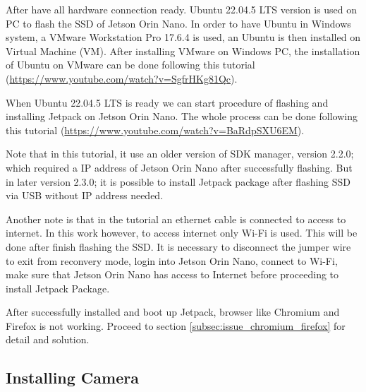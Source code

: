 \documentclass[12pt,hidelinks]{article}
\begin{document}
        \vspace{3mm}

        After have all hardware connection ready. Ubuntu 22.04.5 LTS version is used on PC to flash the SSD of Jetson Orin Nano. In order to have Ubuntu in Windows system, a VMware Workstation Pro 17.6.4 is used, an Ubuntu is then installed on Virtual Machine (VM). After installing VMware on Windows PC, the installation of Ubuntu on VMware can be done following this tutorial ({\footnotesize \url{https://www.youtube.com/watch?v=SgfrHKg81Qc}}). 

        \vspace{3mm}
        
        When Ubuntu 22.04.5 LTS is ready we can start procedure of flashing and installing Jetpack on Jetson Orin Nano. The whole process can be done following this tutorial ({\footnotesize \url{https://www.youtube.com/watch?v=BaRdpSXU6EM}}). 

        \vspace{3mm}
        
        Note that in this tutorial, it use an older version of SDK manager, version 2.2.0; which required a IP address of Jetson Orin Nano after successfully flashing. But in later version 2.3.0; it is possible to install Jetpack package after flashing SSD via USB without IP address needed. 

        \vspace{3mm}

        Another note is that in the tutorial an ethernet cable is connected to access to internet. In this work however, to access internet only Wi-Fi is used. This will be done after finish flashing the SSD. It is necessary to disconnect the jumper wire to exit from reconvery mode, login into Jetson Orin Nano, connect to Wi-Fi, make sure that Jetson Orin Nano has access to Internet before proceeding to install Jetpack Package.

        \vspace{3mm}

        After successfully installed and boot up Jetpack, browser like Chromium and Firefox is not working. Proceed to section \ref{subsec:issue_chromium_firefox} for detail and solution.

        

    \subsection{Installing Camera}
    \label{subsec:install_camera}
\end{document}
